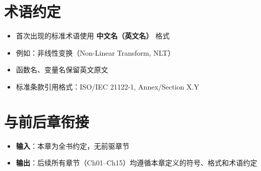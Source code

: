 \section{术语约定}

\begin{itemize}
  \item 首次出现的标准术语使用 \textbf{中文名（英文名）} 格式
  \item 例如：非线性变换（Non-Linear Transform, NLT）
  \item 函数名、变量名保留英文原文
  \item 标准条款引用格式：ISO/IEC 21122-1, Annex/Section X.Y
\end{itemize}

\section{与前后章衔接}

\begin{itemize}
  \item \textbf{输入}：本章为全书约定，无前驱章节
  \item \textbf{输出}：后续所有章节（Ch01--Ch15）均遵循本章定义的符号、格式和术语约定
\end{itemize}
